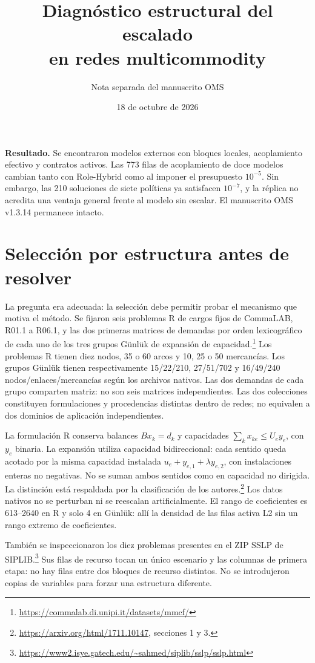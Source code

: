 \documentclass[10pt,a4paper]{article}
\title{Diagnóstico estructural del escalado\\en redes multicommodity}
\author{Nota separada del manuscrito OMS}
\date{18 de octubre de 2026}
\begin{document}
\maketitle
\noindent\textbf{Resultado.} Se encontraron modelos externos con bloques locales,
acoplamiento efectivo y contratos activos. Las 773 filas de acoplamiento de doce
modelos cambian tanto con Role-Hybrid como al imponer el presupuesto $10^{-5}$.
Sin embargo, las 210 soluciones de siete políticas ya satisfacen $10^{-7}$,
y la réplica no acredita una ventaja general frente al modelo sin escalar.
El manuscrito OMS v1.3.14 permanece intacto.

\section{Selección por estructura antes de resolver}
La pregunta era adecuada: la selección debe permitir probar el mecanismo que
motiva el método. Se fijaron seis problemas R de cargos fijos de CommaLAB,
R01.1 a R06.1, y las dos primeras matrices de demandas por orden lexicográfico
de cada uno de los tres grupos Günlük de expansión de capacidad.\footnote{\url{https://commalab.di.unipi.it/datasets/mmcf/}}
Los problemas R tienen diez nodos, 35 o 60 arcos y 10, 25 o 50 mercancías.
Los grupos Günlük tienen respectivamente 15/22/210, 27/51/702 y 16/49/240
nodos/enlaces/mercancías según los archivos nativos. Las dos demandas de cada
grupo comparten matriz: no son seis matrices independientes.
Las dos colecciones constituyen formulaciones y procedencias distintas dentro
de redes; no equivalen a dos dominios de aplicación independientes.

La formulación R conserva balances $Bx_k=d_k$ y capacidades
$\sum_k x_{ke}\le U_e y_e$, con $y_e$ binaria.
La expansión utiliza capacidad bidireccional: cada sentido queda acotado por
la misma capacidad instalada $u_e+y_{e,1}+\lambda y_{e,2}$, con instalaciones
enteras no negativas. No se suman ambos sentidos como en capacidad no dirigida.
La distinción está respaldada por la clasificación de los autores.\footnote{\url{https://arxiv.org/html/1711.10147}, secciones 1 y 3.}
Los datos nativos no se perturban ni se reescalan artificialmente.
El rango de coeficientes es 613--2640 en R y solo 4 en Günlük: allí la
densidad de las filas activa L2 sin un rango extremo de coeficientes.

También se inspeccionaron los diez problemas presentes en el ZIP SSLP de
SIPLIB.\footnote{\url{https://www2.isye.gatech.edu/~sahmed/siplib/sslp/sslp.html}}
Sus filas de recurso tocan un único escenario y las columnas de primera etapa:
no hay filas entre dos bloques de recurso distintos. No se introdujeron copias
de variables para forzar una estructura diferente.
\end{document}
